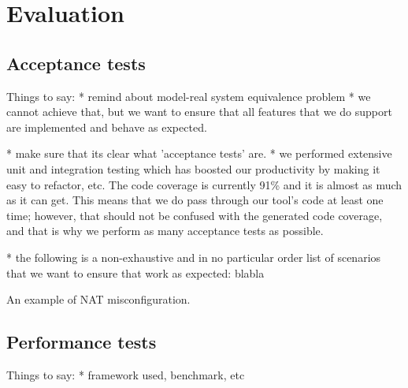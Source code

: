 \chapter{Evaluation}\label{chapter:eval}

\section{Acceptance tests}

Things to say:
* remind about model-real system equivalence problem
* we cannot achieve that, but we want to ensure that all features that we do
support are implemented and behave as expected.

* make sure that its clear what 'acceptance tests' are.
* we performed extensive unit and integration testing which has boosted our
productivity by making it easy to refactor, etc.  The code coverage is
currently 91\% and it is almost as much as it can get.  This means that we do
pass through our tool's code at least one time; however, that should not be
confused with the generated code coverage, and that is why we perform as many
acceptance tests as possible.

* the following is a non-exhaustive and in no particular order list of
scenarios that we want to ensure that work as expected: blabla

\begin{listing}[H]
  \caption{An example of NAT misconfiguration.}
  \label{lst:example}
\end{listing}

\section{Performance tests}
Things to say:
* framework used, benchmark, etc
